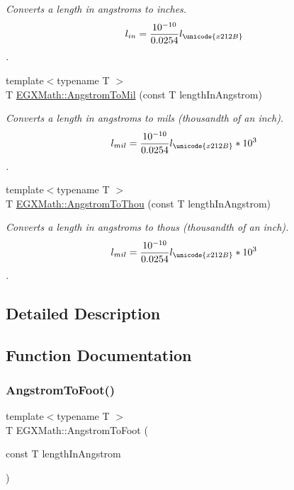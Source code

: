 \begin{DoxyCompactItemize}
\begin{DoxyCompactList}\small\item\em Converts a length in angstroms to inches. \[ l_{in}= \frac{10^{-10}}{0.0254} l_{\unicode{x212B}} \]. \end{DoxyCompactList}\item 
{\footnotesize template$<$typename T $>$ }\\T \mbox{\hyperlink{group___e_g_x_math-_conversions-_length_conversions-_non-_s_i-_angstrom-_imperial_gae8d17e18786a104634ccfa6b9f46f314}{E\+G\+X\+Math\+::\+Angstrom\+To\+Mil}} (const T length\+In\+Angstrom)
\begin{DoxyCompactList}\small\item\em Converts a length in angstroms to mils (thousandth of an inch). \[ l_{mil}= \frac{10^{-10}}{0.0254} l_{\unicode{x212B}} * 10^{3} \]. \end{DoxyCompactList}\item 
{\footnotesize template$<$typename T $>$ }\\T \mbox{\hyperlink{group___e_g_x_math-_conversions-_length_conversions-_non-_s_i-_angstrom-_imperial_gafdf126044e17b0d3e0d83e510ba11990}{E\+G\+X\+Math\+::\+Angstrom\+To\+Thou}} (const T length\+In\+Angstrom)
\begin{DoxyCompactList}\small\item\em Converts a length in angstroms to thous (thousandth of an inch). \[ l_{mil}= \frac{10^{-10}}{0.0254} l_{\unicode{x212B}} * 10^{3} \]. \end{DoxyCompactList}\end{DoxyCompactItemize}


\subsection{Detailed Description}


\subsection{Function Documentation}
\mbox{\label{group___e_g_x_math-_conversions-_length_conversions-_non-_s_i-_angstrom-_imperial_ga54cf539cd2acf7065ed22fb4a846d933}} 
\subsubsection{\texorpdfstring{Angstrom\+To\+Foot()}{AngstromToFoot()}}
{\footnotesize\ttfamily template$<$typename T $>$ \\
T E\+G\+X\+Math\+::\+Angstrom\+To\+Foot (\begin{DoxyParamCaption}\item[{const T}]{length\+In\+Angstrom }\end{DoxyParamCaption})}



